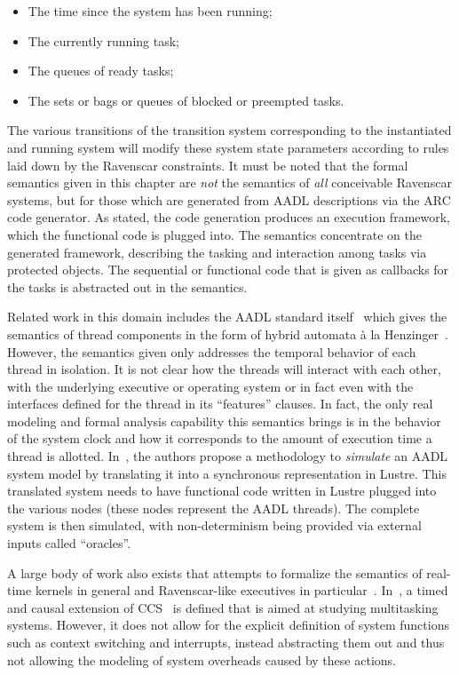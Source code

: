 \begin{itemize}
\item{The time since the system has been running;}
\item{The currently running task;}
\item{The queues of ready tasks;}
\item{The sets or bags or queues of blocked or preempted tasks.}
\end{itemize}

The various transitions of the transition system corresponding to the
instantiated and running system will modify these system state
parameters according to rules laid down by the Ravenscar
constraints. It must be noted that the formal semantics given in this
chapter are \emph{not} the semantics of \emph{all} conceivable
Ravenscar systems, but for those which are generated from AADL
descriptions via the ARC code generator. As stated, the code
generation produces an execution framework, which the functional code
is plugged into. The semantics concentrate on the generated framework,
describing the tasking and interaction among tasks via protected
objects. The sequential or functional code that is given as callbacks
for the tasks is abstracted out in the semantics.

Related work in this domain includes the AADL standard
itself~\cite{AS5506} which gives the semantics of thread components in
the form of hybrid automata \`a la
Henzinger~\cite{henzinger@slcs96}. However, the semantics given only
addresses the temporal behavior of each thread in isolation. It is not
clear how the threads will interact with each other, with the
underlying executive or operating system or in fact even with the
interfaces defined for the thread in its ``features'' clauses. In
fact, the only real modeling and formal analysis capability this
semantics brings is in the behavior of the system clock and how it
corresponds to the amount of execution time a thread is
allotted. In~\cite{halbwachs@emsoft07}, the authors propose a
methodology to \emph{simulate} an AADL system model by translating it
into a synchronous representation in Lustre. This translated system
needs to have functional code written in Lustre plugged into the
various nodes (these nodes represent the AADL threads). The complete
system is then simulated, with non-determinism being provided via
external inputs called ``oracles''.

A large body of work also exists that attempts to formalize the
semantics of real-time kernels in general and Ravenscar-like
executives in particular~\cite{fowler@rtss97, lundqvist@rtcsa99,
  vardanega@rts05, fidge@amast00}. In~\cite{fidge@amast00}, a timed
and causal extension of CCS~\cite{milner-cc} is defined that is aimed
at studying multitasking systems. However, it does not allow for the
explicit definition of system functions such as context switching and
interrupts, instead abstracting them out and thus not allowing the
modeling of system overheads caused by these actions.

